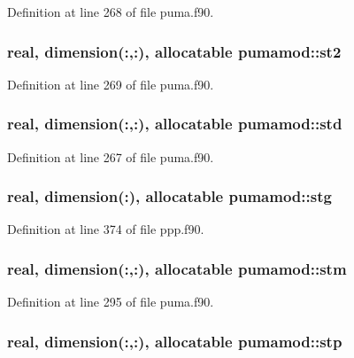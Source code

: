 \-Definition at line 268 of file puma.\-f90.

\hypertarget{classpumamod_a69fc3701590281746d17dcb2f80c1c03}{
\subsubsection[{st2}]{\setlength{\rightskip}{0pt plus 5cm}real, dimension(\-:,\-:), allocatable {\bf pumamod\-::st2}}}
\label{classpumamod_a69fc3701590281746d17dcb2f80c1c03}


\-Definition at line 269 of file puma.\-f90.

\hypertarget{classpumamod_ac4bf8bb0f46d1d2f91f95e10be02a738}{
\subsubsection[{std}]{\setlength{\rightskip}{0pt plus 5cm}real, dimension(\-:,\-:), allocatable {\bf pumamod\-::std}}}
\label{classpumamod_ac4bf8bb0f46d1d2f91f95e10be02a738}


\-Definition at line 267 of file puma.\-f90.

\hypertarget{classpumamod_ab9cb9fb36cedabd96373ce2d69554d93}{
\subsubsection[{stg}]{\setlength{\rightskip}{0pt plus 5cm}real, dimension(\-:), allocatable {\bf pumamod\-::stg}}}
\label{classpumamod_ab9cb9fb36cedabd96373ce2d69554d93}


\-Definition at line 374 of file ppp.\-f90.

\hypertarget{classpumamod_a636c3a27cc6a7aa8f63fd4d322406517}{
\subsubsection[{stm}]{\setlength{\rightskip}{0pt plus 5cm}real, dimension(\-:,\-:), allocatable {\bf pumamod\-::stm}}}
\label{classpumamod_a636c3a27cc6a7aa8f63fd4d322406517}


\-Definition at line 295 of file puma.\-f90.

\hypertarget{classpumamod_aad8ec9e8e440a8a077624b05430d1d65}{
\subsubsection[{stp}]{\setlength{\rightskip}{0pt plus 5cm}real, dimension(\-:,\-:), allocatable {\bf pumamod\-::stp}}}
\label{classpumamod_aad8ec9e8e440a8a077624b05430d1d65}


